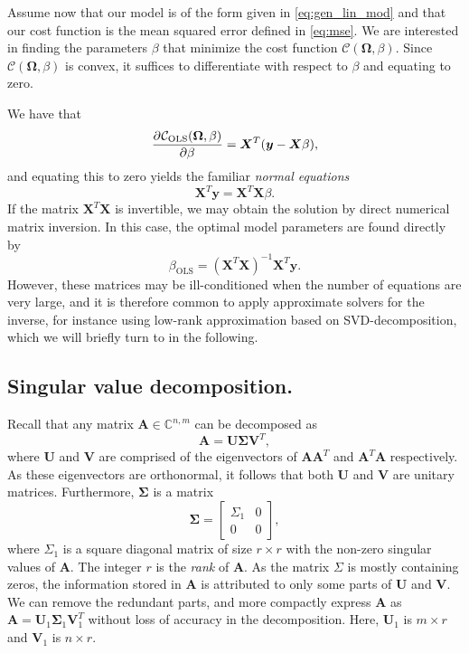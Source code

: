 \documentclass[dvipsnames, article, a4paper, oneside, 12pt]{memoir}
\newcommand{\C}{\mathbb{C}}
\newcommand{\X}{\bm{X}}
\newcommand{\OLS}{\mathrm{OLS}}
\newcommand{\mat}[1]{\bm{#1}}
\newcommand{\y}{\bm{y}}
\newcommand{\data}{\bm{\Omega}}
\newcommand{\cost}{\mathcal{C}}
\begin{document}
  Assume now that our model is of the form given in \cref{eq:gen_lin_mod} and
  that our cost function is the mean squared error defined in \cref{eq:mse}. We
  are interested in finding the parameters \( \beta \) that minimize the cost
  function \( \cost(\data, \beta) \). Since \( \cost(\data, \beta) \) is
  convex, it suffices to differentiate with respect to \( \beta \) and equating
  to zero. 
  
  We have that
  \begin{align}
    \dpd{\cost_\OLS(\data, \beta)}{\beta} = \X^T(\y - \X\beta), 
  \end{align}
  and equating this to zero yields the familiar \emph{normal equations}
  \begin{equation}
    \X^T \y = \X^T\X\beta.
  \end{equation}
  If the matrix \( \X^T\X \) is invertible, we may obtain the solution by
  direct numerical matrix inversion. In this case, the optimal model parameters
  are found directly by
  \begin{equation}
    \label{eq:optimal}
    \beta_{\OLS} = (\X^T\X)^{-1}\X^T\y.
  \end{equation}
  However, these matrices may be ill-conditioned when the number of equations
  are very large, and it is therefore common to apply approximate solvers for
  the inverse, for instance using low-rank approximation based on
  \textsc{SVD}-decomposition, which we will briefly turn to in the following.

  \subsection{Singular value decomposition.}
  
  Recall that any matrix \( \mat{A} \in \C^{n, m} \) can be decomposed as
  \begin{equation}
    \mat{A} = \mat{U} \mat{\Sigma}\mat{V}^T,
  \end{equation}
  where \( \mat{U} \) and \( \mat{V} \) are comprised of the eigenvectors of \(
  \mat{A}\mat{A}^T \) and \( \mat{A}^T\mat{A} \) respectively. As these
  eigenvectors are orthonormal, it follows that both \( \mat{U} \) and \(
  \mat{V} \) are unitary matrices. Furthermore, \( \mat{\Sigma} \) is a matrix 
  \begin{equation}
    \mat{\Sigma} = \begin{bmatrix}
      \Sigma_1 & 0 \\
       0 & 0
    \end{bmatrix},
  \end{equation}
  where \( \Sigma_1 \) is a square diagonal matrix of size \( r \times r \)
  with the non-zero singular values of \( \mat{A} \). The integer \( r \) is
  the \emph{rank} of \( \mat{A} \). As the matrix \( \Sigma \) is mostly
  containing zeros, the information stored in \( \mat{A} \) is attributed to
  only some parts of \( \mat{U} \) and \( \mat{V} \). We can remove the
  redundant parts, and more compactly express \( \mat{A} \) as \( \mat{A} =
  \mat{U}_1 \mat{\Sigma}_1 \mat{V}_1^T \) without loss of accuracy in the
  decomposition. Here, \( \mat{U}_1 \) is \( m \times r \) and \( \mat{V}_1 \)
  is \( n \times r \).
\end{document}
